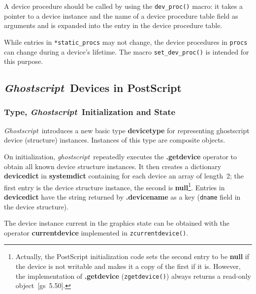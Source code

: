 \documentclass[twoside,a4paper]{article}
\newcommand{\gs}{\textit{ghostscript\/}}
\newcommand{\Gs}{\textit{Ghostscript\/}}
\newcommand{\ps}[1]{{\sffamily\bfseries #1}}	%
\newcommand{\prog}[1]{\texttt{#1}}
\begin{document}
A device procedure should be called by using the \prog{dev\_proc()} macro:
it takes a pointer to a device instance and the name of a device
procedure table field as arguments and is expanded into the entry in the
device procedure table.

While entries in \prog{*static\_procs} may not change,
the device procedures in \prog{procs} can change during a device's lifetime.
The macro \prog{set\_dev\_proc()} is intended for this purpose.


\subsection{\Gs\ Devices in PostScript}

\subsubsection{Type, \Gs\ Initialization and State}

\Gs\ introduces a new basic type \ps{devicetype} for representing ghostscript
device (structure) instances.
Instances of this type are composite objects.	%

On initialization,
\gs\ repeatedly executes the \ps{.getdevice} operator to obtain
all known device structure instances.
It then creates a dictionary \ps{devicedict} in \ps{systemdict} containing
for each device an array of length~2;
the first entry is the device structure instance,   %
the second is \ps{null}\footnote{
  Actually, the PostScript initialization code sets the second entry to be
  \ps{null} if the device is not writable and
  makes it a copy of the first if it is.
  However, the implementation of \ps{.getdevice} (\prog{zgetdevice()})
  always returns a read-only object~[gs~5.50].	%
  }.
Entries in \ps{devicedict} have the string returned by \ps{.devicename} as a
key (\prog{dname} field in the device structure).	%

The device instance current in the graphics state
can be obtained with the operator
\ps{currentdevice} implemented in \prog{zcurrentdevice()}.
\end{document}
